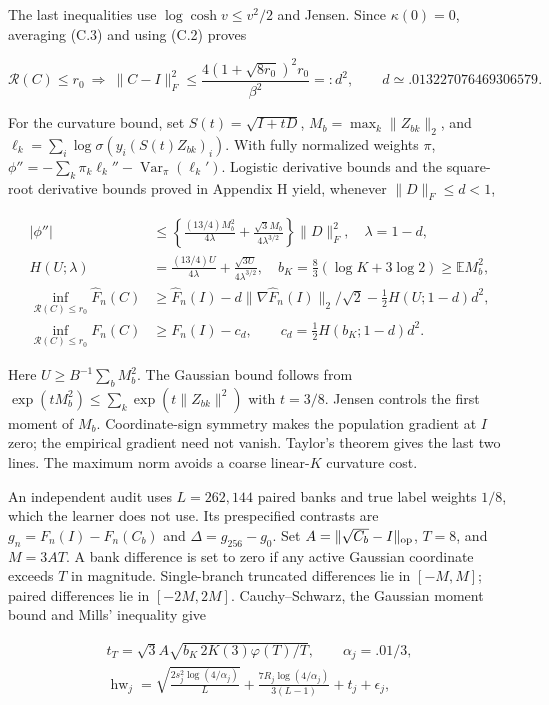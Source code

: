 \documentclass{article}
\begin{document}
The last inequalities use \(\log\cosh v\le v^2/2\) and Jensen. Since
\(\kappa(0)=0\), averaging (C.3) and using (C.2) proves

\[
\mathcal R(C)\le r_0\ \Longrightarrow\
\|C-I\|_F^2\le\frac{4(1+\sqrt{8r_0})^2r_0}{\beta^2}=:d^2,
\qquad d\simeq.013227076469306579.
\tag{C.4}
\]

For the curvature bound, set \(S(t)=\sqrt{I+tD}\),
\(M_b=\max_k\|Z_{bk}\|_2\), and
\(\ell_k=\sum_i\log\sigma(y_i(S(t)Z_{bk})_i)\). With fully normalized
weights \(\pi\),
\(\phi''=-\sum_k\pi_k\ell_k''-\operatorname{Var}_{\pi}(\ell_k')\).
Logistic derivative bounds and the square-root derivative bounds proved
in Appendix H yield, whenever \(\|D\|_F\le d<1\),

\[
\begin{aligned}
|\phi''|&\le\left\{\frac{(13/4)M_b^2}{4\lambda}+\frac{\sqrt3M_b}{4\lambda^{3/2}}\right\}\|D\|_F^2,\quad\lambda=1-d,\\
H(U;\lambda)&=\frac{(13/4)U}{4\lambda}+\frac{\sqrt{3U}}{4\lambda^{3/2}},\quad
b_K=\tfrac83(\log K+3\log2)\ge\mathbb E M_b^2,\\
\inf_{\mathcal R(C)\le r_0}\widehat F_n(C)&\ge\widehat F_n(I)-d\|\nabla\widehat F_n(I)\|_2/\sqrt2-\tfrac12H(U;1-d)d^2,\\
\inf_{\mathcal R(C)\le r_0}F_n(C)&\ge F_n(I)-c_d,\qquad c_d=\tfrac12H(b_K;1-d)d^2.
\end{aligned}
\tag{C.5}
\]

Here \(U\ge B^{-1}\sum_bM_b^2\). The Gaussian bound follows from
\(\exp(tM_b^2)\le\sum_k\exp(t\|Z_{bk}\|^2)\) with \(t=3/8\). Jensen
controls the first moment of \(M_b\). Coordinate-sign symmetry makes the
population gradient at \(I\) zero; the empirical gradient need not
vanish. Taylor's theorem gives the last two lines. The maximum norm
avoids a coarse linear-\(K\) curvature cost.

An independent audit uses \(L=262,144\) paired banks and true label
weights \(1/8\), which the learner does not use. Its prespecified
contrasts are \(g_n=F_n(I)-F_n(C_b)\) and \(\Delta=g_{256}-g_0\). Set
\(A=\|\sqrt{C_b}-I\|_{\rm op}\), \(T=8\), and \(M=3AT\). A bank
difference is set to zero if any active Gaussian coordinate exceeds
\(T\) in magnitude. Single-branch truncated differences lie in
\([-M,M]\); paired differences lie in \([-2M,2M]\). Cauchy--Schwarz, the
Gaussian moment bound and Mills' inequality give

\[
\begin{gathered}
t_T=\sqrt3A\sqrt{b_K\,2K(3)\varphi(T)/T},\qquad\alpha_j=.01/3,\\
\operatorname{hw}_j=\sqrt{\frac{2s_j^2\log(4/\alpha_j)}L}
+\frac{7R_j\log(4/\alpha_j)}{3(L-1)}+t_j+\epsilon_j,
\end{gathered}
\tag{C.6}
\]
\end{document}
